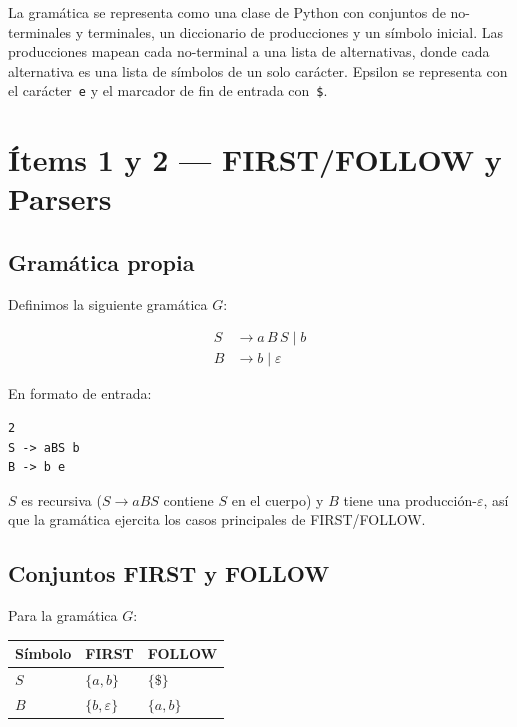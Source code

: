 \documentclass[11pt,a4paper]{article}
\begin{document}
La gram\'atica se representa como una clase de Python con conjuntos de no-terminales y terminales, un diccionario de producciones y un s\'imbolo inicial. Las producciones mapean cada no-terminal a una lista de alternativas, donde cada alternativa es una lista de s\'imbolos de un solo car\'acter. Epsilon se representa con el car\'acter~\texttt{e} y el marcador de fin de entrada con~\texttt{\$}.


\section{\'Items 1 y 2 --- FIRST/FOLLOW y Parsers}
\label{sec:items12}

\subsection{Gram\'atica propia}

Definimos la siguiente gram\'atica $G$:

\begin{align*}
S &\to a\,B\,S \mid b \\
B &\to b \mid \varepsilon
\end{align*}

En formato de entrada:
\begin{lstlisting}
2
S -> aBS b
B -> b e
\end{lstlisting}

$S$ es recursiva ($S \to aBS$ contiene $S$ en el cuerpo) y $B$ tiene una producci\'on-$\varepsilon$, as\'i que la gram\'atica ejercita los casos principales de FIRST/FOLLOW.

\subsection{Conjuntos FIRST y FOLLOW}

Para la gram\'atica $G$:

\begin{center}
\begin{tabular}{@{}lll@{}}
\toprule
\textbf{S\'imbolo} & \textbf{FIRST} & \textbf{FOLLOW} \\
\midrule
$S$ & $\{a, b\}$     & $\{\$\}$   \\
$B$ & $\{b, \varepsilon\}$    & $\{a, b\}$ \\
\bottomrule
\end{tabular}
\end{center}
\end{document}
